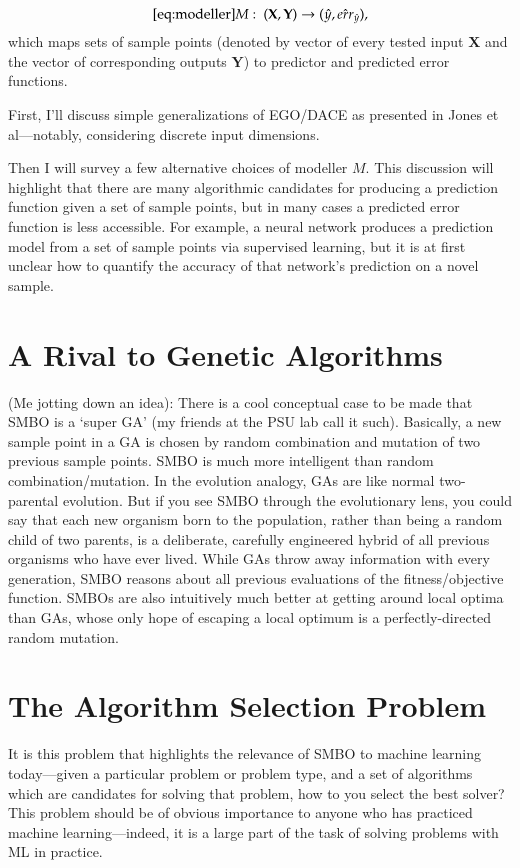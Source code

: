 \begin{equation}\ref{eq:modeller}
M:\ (\mathbf{X},\mathbf{Y})\rightarrow (\hat{y},\hat{err}_{\hat{y}}),
\end{equation}
which maps sets of sample points (denoted by vector of every tested input $\mathbf{X}$ and the vector of corresponding outputs $\mathbf{Y}$) to predictor and predicted error functions.

First, I'll discuss simple generalizations of EGO/DACE as presented in Jones et al---notably, considering discrete input dimensions.

Then I will survey a few alternative choices of modeller $M$. This discussion will highlight that there are many algorithmic candidates for producing a prediction function given a set of sample points, but in many cases a predicted error function is less accessible. For example, a neural network produces a prediction model from a set of sample points via supervised learning, but it is at first unclear how to quantify the accuracy of that network's prediction on a novel sample.


\section{A Rival to Genetic Algorithms}

(Me jotting down an idea): There is a cool conceptual case to be made that SMBO is a `super GA' (my friends at the PSU lab call it such). Basically, a new sample point in a GA is chosen by random combination and mutation of two previous sample points. SMBO is much more intelligent than random combination/mutation. In the evolution analogy, GAs are like normal two-parental evolution. But if you see SMBO through the evolutionary lens, you could say that each new organism born to the population, rather than being a random child of two parents, is a deliberate, carefully engineered hybrid of all previous organisms who have ever lived. While GAs throw away information with every generation, SMBO reasons about all previous evaluations of the fitness/objective function. SMBOs are also intuitively much better at getting around local optima than GAs, whose only hope of escaping a local optimum is a perfectly-directed random mutation.


\section{The Algorithm Selection Problem}

It is this problem that highlights the relevance of SMBO to machine learning today---given a particular problem or problem type, and a set of algorithms which are candidates for solving that problem, how to you select the best solver? This problem should be of obvious importance to anyone who has practiced machine learning---indeed, it is a large part of the task of solving problems with ML in practice.

